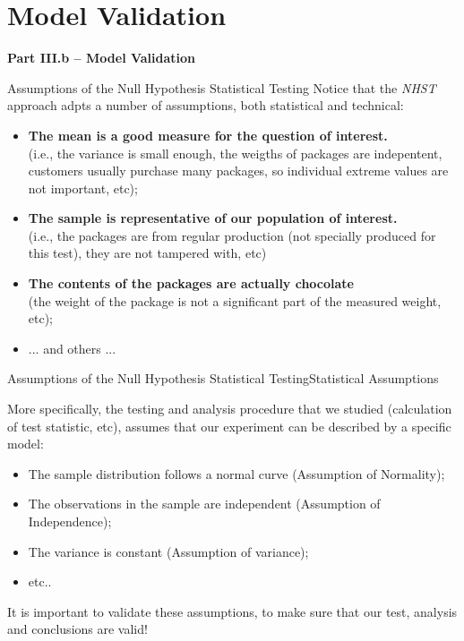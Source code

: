 \section{Model Validation}

\begin{frame}
  \begin{center}
    {\bf Part III.b -- Model Validation}
  \end{center}
\end{frame}

\begin{frame}{Assumptions of the Null Hypothesis Statistical Testing}
  Notice that the \emph{NHST} approach adpts a number of assumptions, both statistical and technical:

  \begin{itemize}
    \item {\bf The mean is a good measure for the question of interest.}\\
    (i.e., the variance is small enough, the weigths of packages are indepentent, customers usually purchase many packages, so individual extreme values are not important, etc);\bigskip

    \item {\bf The sample is representative of our population of interest.}\\
    (i.e., the packages are from regular production (not specially produced for this test), they are not tampered with, etc)\bigskip

    \item {\bf The contents of the packages are actually chocolate}\\
    (the weight of the package is not a significant part of the measured weight, etc);\bigskip

    \item ... and others ...
  \end{itemize}
\end{frame}

\begin{frame}{Assumptions of the Null Hypothesis Statistical Testing}{Statistical Assumptions}

  More specifically, the testing and analysis procedure that we studied (calculation of test statistic, etc), assumes that our experiment can be described by a specific model:\bigskip

  \begin{itemize}
    \item The sample distribution follows a normal curve (Assumption of Normality);
    \item The observations in the sample are independent (Assumption of Independence);
    \item The variance is constant (Assumption of variance);
    \item etc..
  \end{itemize}\bigskip

  It is important to validate these assumptions, to make sure that our test, analysis and conclusions are valid!
\end{frame}

